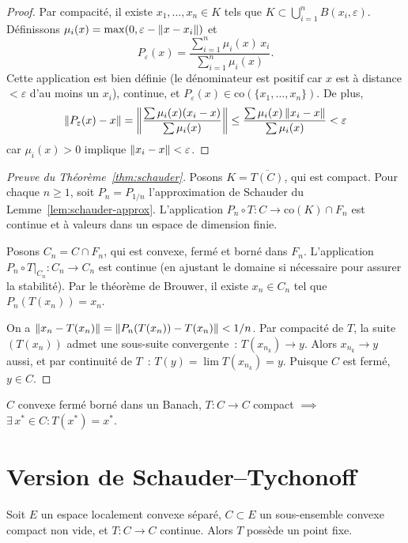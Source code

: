 \begin{proof}
Par compacit\'e, il existe $x_1, \ldots, x_n \in K$ tels que
$K \subset \bigcup_{i=1}^n B(x_i, \varepsilon)$.
D\'efinissons $\mu_i(x) = \max(0, \varepsilon - \left\| x - x_i \right\|)$ et
\[
    P_\varepsilon(x) = \frac{\sum_{i=1}^n \mu_i(x) \, x_i}{\sum_{i=1}^n \mu_i(x)}.
\]
Cette application est bien d\'efinie (le d\'enominateur est positif car $x$ est
\`a distance $< \varepsilon$ d'au moins un $x_i$), continue, et
$P_\varepsilon(x) \in \mathrm{co}(\{x_1, \ldots, x_n\})$. De plus,
\[
    \left\| P_\varepsilon(x) - x \right\| = \left\| \frac{\sum \mu_i(x)(x_i - x)}{\sum \mu_i(x)} \right\|
    \leq \frac{\sum \mu_i(x) \left\| x_i - x \right\|}{\sum \mu_i(x)} < \varepsilon
\]
car $\mu_i(x) > 0$ implique $\left\| x_i - x \right\| < \varepsilon$.
\end{proof}

\begin{proof}[Preuve du Th\'eor\`eme~\ref{thm:schauder}]
Posons $K = \overline{T(C)}$, qui est compact. Pour chaque $n \geq 1$,
soit $P_n = P_{1/n}$ l'approximation de Schauder du Lemme~\ref{lem:schauder-approx}.
L'application $P_n \circ T : C \to \mathrm{co}(K) \cap F_n$ est continue et
\`a valeurs dans un espace de dimension finie.

Posons $C_n = C \cap F_n$, qui est convexe, ferm\'e et born\'e dans $F_n$.
L'application $P_n \circ T|_{C_n} : C_n \to C_n$ est continue (en ajustant le
domaine si n\'ecessaire pour assurer la stabilit\'e). Par le th\'eor\`eme de
Brouwer, il existe $x_n \in C_n$ tel que $P_n(T(x_n)) = x_n$.

On a $\left\| x_n - T(x_n) \right\| = \left\| P_n(T(x_n)) - T(x_n) \right\| < 1/n$. Par compacit\'e
de $T$, la suite $(T(x_n))$ admet une sous-suite convergente~: $T(x_{n_k}) \to y$.
Alors $x_{n_k} \to y$ aussi, et par continuit\'e de $T$~: $T(y) = \lim T(x_{n_k}) = y$.
Puisque $C$ est ferm\'e, $y \in C$.
\end{proof}

\begin{formules}[title=\textbf{Th\'eor\`eme de Schauder}]
$C$ convexe ferm\'e born\'e dans un Banach, $T : C \to C$ compact $\implies$
$\exists\, x^* \in C : T(x^*) = x^*$.
\end{formules}

\section{Version de Schauder--Tychonoff}

\begin{theoreme}
Soit $E$ un espace localement convexe s\'epar\'e, $C \subset E$ un sous-ensemble
convexe compact non vide, et $T : C \to C$ continue. Alors $T$ poss\`ede un
point fixe.
\end{theoreme}


